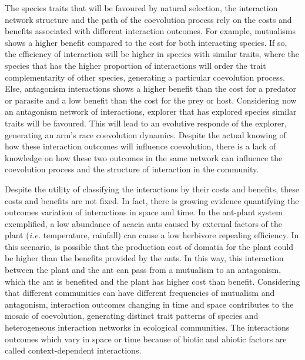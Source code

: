 \documentclass[a4paper, 12pt]{article}
\begin{document}
The species traits that will be favoured by natural selection, the interaction network structure and the path of the coevolution process rely on the costs and benefits associated with different interaction outcomes. For example, mutualisms shows a higher benefit compared to the cost for both interacting species. If so, the efficiency of interaction will be higher in species with similar traits, where the species that has the higher proportion of interactions will order the trait complementarity of other species, generating a particular coevolution process. Else, antagonism interactions shows a higher benefit than the cost for a predator or parasite and a low benefit than the cost for the prey or host. Considering now an antagonism network of interactions, explorer that has explored species similar traits will be favoured. This will lead to an evolutive responde of the explorer, generating an arm's race coevolution dynamics. Despite the actual knowing of how these interaction outcomes will influence coevolution, there is a lack of knowledge on how these two outcomes in the same network can influence the coevolution process and the structure of interaction in the community.

Despite the utility of classifying the interactions by their costs and benefits, these costs and benefits are not fixed. In fact, there is growing evidence quantifying the outcomes variation of interactions in space and time. In the ant-plant system exemplified, a low abundance of acacia ants caused by external factors of the plant (\textit{i.e.} temperature, rainfall) can cause a low herbivore repealing efficiency. In this scenario, is possible that the production cost of domatia for the plant could be higher than the benefits provided by the ants. In this way, this interaction between the plant and the ant can pass from a mutualism to an antagonism, which the ant is benefited and the plant has higher cost than benefit. Considering that different communities can have different frequencies of mutualism and antagonism, interaction outcomes changing in time and space contributes to the mosaic of coevolution, generating distinct trait patterns of species and heterogeneous interaction networks in ecological communities. The interactions outcomes which vary in space or time because of biotic and abiotic factors are called context-dependent interactions.
\end{document}

